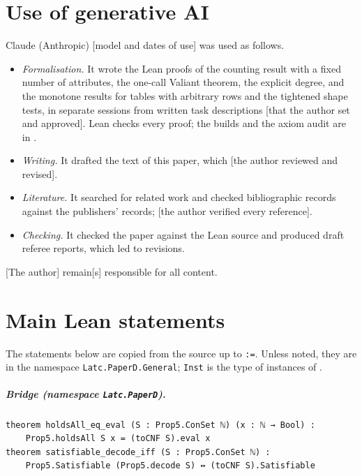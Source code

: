 \documentclass[a4paper,UKenglish,cleveref,autoref,thm-restate]{lipics-v2021}
\begin{document}
\section*{Use of generative AI}
Claude (Anthropic) [model and dates of use] was used as follows.
\begin{itemize}
\item \emph{Formalisation.} It wrote the Lean proofs of the counting result with a fixed number of
  attributes, the one-call Valiant theorem, the explicit degree, and the monotone results for
  tables with arbitrary rows and the tightened shape tests, in separate sessions from written task
  descriptions [that the author set and approved]. Lean checks every proof; the builds and the
  axiom audit are in .
\item \emph{Writing.} It drafted the text of this paper, which [the author reviewed and revised].
\item \emph{Literature.} It searched for related work and checked bibliographic records against
  the publishers' records; [the author verified every reference].
\item \emph{Checking.} It checked the paper against the Lean source and produced draft referee
  reports, which led to revisions.
\end{itemize}
[The author] remain[s] responsible for all content.



\appendix

\section{Main Lean statements}
\label{app:statements}

The statements below are copied from the source up to \lstinline{:=}. Unless noted, they are in
the namespace \lstinline{Latc.PaperD.General}; \lstinline{Inst} is the type of instances of
.

\subparagraph*{Bridge (namespace \lstinline{Latc.PaperD}).}
\begin{lstlisting}
theorem holdsAll_eq_eval (S : Prop5.ConSet ℕ) (x : ℕ → Bool) :
    Prop5.holdsAll S x = (toCNF S).eval x
theorem satisfiable_decode_iff (S : Prop5.ConSet ℕ) :
    Prop5.Satisfiable (Prop5.decode S) ↔ (toCNF S).Satisfiable
\end{lstlisting}
\end{document}
